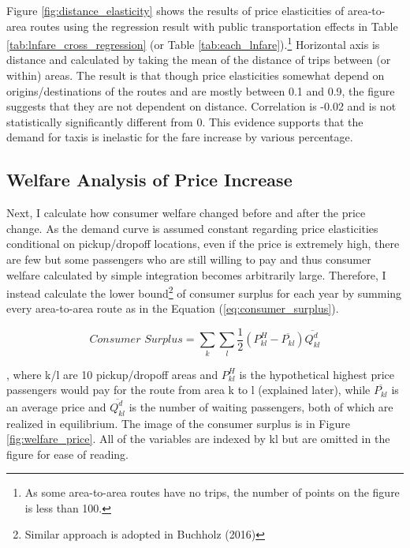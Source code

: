 Figure \ref{fig:distance_elasticity} shows the results of price elasticities of area-to-area routes using the regression result with public transportation effects in Table \ref{tab:lnfare_cross_regression} (or Table \ref{tab:each_lnfare}).\footnote{As some area-to-area routes have no trips, the number of points on the figure is less than 100.} Horizontal axis is distance and calculated by taking the mean of the distance of trips between (or within) areas. The result is that though price elasticities somewhat depend on origins/destinations of the routes and are mostly between 0.1 and 0.9, the figure suggests that they are not dependent on distance. Correlation is -0.02 and is not statistically significantly different from 0. This evidence supports that the demand for taxis is inelastic for the fare increase by various percentage. 

\vspace{0.5cm}



\subsection{Welfare Analysis of Price Increase}
\hspace{0.5cm} Next, I calculate how consumer welfare changed before and after the price change. As the demand curve is assumed constant regarding price elasticities conditional on pickup/dropoff locations, even if the price is extremely high, there are few but some passengers who are still willing to pay and thus consumer welfare calculated by simple integration becomes arbitrarily large. Therefore, I instead calculate the lower bound\footnote{Similar approach is adopted in Buchholz (2016)} of consumer surplus for each year by summing every area-to-area route as in the Equation (\ref{eq:consumer_surplus}).


\begin{equation}
Consumer\,\, Surplus = \sum_k \sum_l \frac{1}{2}(P^H_{kl}-\overline{P_{kl}})\overline{Q^d_{kl}}\label{eq:consumer_surplus}
\end{equation}

\noindent , where k/l are 10 pickup/dropoff areas and $P^H_{kl}$ is the hypothetical highest price passengers would pay for the route from area k to l (explained later), while $\overline{P_{kl}}$ is an average price and $\overline{Q^d_{kl}}$ is the number of waiting passengers, both of which are realized in equilibrium. The image of the consumer surplus is in Figure \ref{fig:welfare_price}. All of the variables are indexed by kl but are omitted in the figure for ease of reading. 

